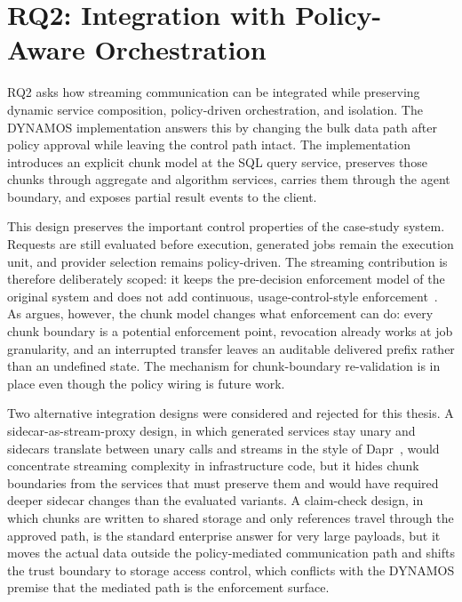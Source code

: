 \section{RQ2: Integration with Policy-Aware Orchestration}\label{sec:discussion-rq2}

RQ2 asks how streaming communication can be integrated while preserving dynamic service composition, policy-driven orchestration, and isolation. The DYNAMOS implementation answers this by changing the bulk data path after policy approval while leaving the control path intact. The implementation introduces an explicit chunk model at the SQL query service, preserves those chunks through aggregate and algorithm services, carries them through the agent boundary, and exposes partial result events to the client.

This design preserves the important control properties of the case-study system. Requests are still evaluated before execution, generated jobs remain the execution unit, and provider selection remains policy-driven. The streaming contribution is therefore deliberately scoped: it keeps the pre-decision enforcement model of the original system and does not add continuous, usage-control-style enforcement~\cite{park2004ucon}. As  argues, however, the chunk model changes what enforcement can do: every chunk boundary is a potential enforcement point, revocation already works at job granularity, and an interrupted transfer leaves an auditable delivered prefix rather than an undefined state. The mechanism for chunk-boundary re-validation is in place even though the policy wiring is future work.

Two alternative integration designs were considered and rejected for this thesis. A sidecar-as-stream-proxy design, in which generated services stay unary and sidecars translate between unary calls and streams in the style of Dapr~\cite{figueira2024selfadaptive}, would concentrate streaming complexity in infrastructure code, but it hides chunk boundaries from the services that must preserve them and would have required deeper sidecar changes than the evaluated variants. A claim-check design, in which chunks are written to shared storage and only references travel through the approved path, is the standard enterprise answer for very large payloads, but it moves the actual data outside the policy-mediated communication path and shifts the trust boundary to storage access control, which conflicts with the DYNAMOS premise that the mediated path is the enforcement surface.

